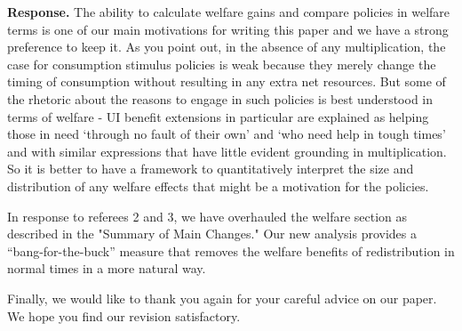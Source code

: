 \documentclass[12pt,letterpaper,english]{article}
\begin{document}
\begin{enumerate}
\noindent \textbf{Response.} The ability to calculate welfare gains and compare policies in welfare terms is one of our main motivations for writing this paper and we have a strong preference to keep it. As you point out, in the absence of any multiplication, the case for consumption stimulus policies is weak because they merely change the timing of consumption without resulting in any extra net resources. But some of the rhetoric about the reasons to engage in such policies is best understood in terms of welfare - UI benefit extensions in particular are explained as helping those in need `through no fault of their own' and `who need help in tough times' and with similar expressions that have little evident grounding in multiplication. So it is better to have a framework to quantitatively interpret the size and distribution of any welfare effects that might be a motivation for the policies.

In response to referees 2 and 3, we have overhauled the welfare section as described in the "Summary of Main Changes." Our new analysis provides a ``bang-for-the-buck'' measure that removes the welfare benefits of redistribution in normal times in a more natural way.


\end{enumerate}

\bigskip

\noindent Finally, we would like to thank you again for your careful advice on our paper. We hope you find our revision satisfactory.

%

\end{document}

